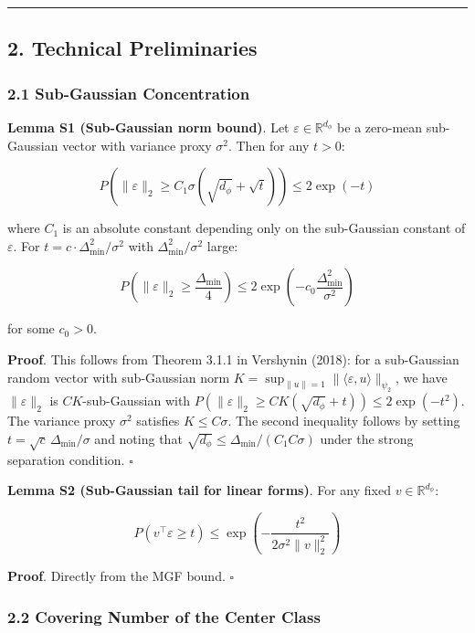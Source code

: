 \documentclass[
  12pt,
]{article}
\begin{document}
\begin{center}\rule{0.5\linewidth}{0.5pt}\end{center}

\subsection{2. Technical Preliminaries}\label{technical-preliminaries}

\subsubsection{2.1 Sub-Gaussian
Concentration}\label{sub-gaussian-concentration}

\textbf{Lemma S1 (Sub-Gaussian norm bound)}. Let
\(\varepsilon \in \mathbb{R}^{d_\phi}\) be a zero-mean sub-Gaussian
vector with variance proxy \(\sigma^2\). Then for any \(t > 0\):

\[P\left(\|\varepsilon\|_2 \geq C_1 \sigma \left(\sqrt{d_\phi} + \sqrt{t}\right)\right) \leq 2 \exp(-t)\]

where \(C_1\) is an absolute constant depending only on the sub-Gaussian
constant of \(\varepsilon\). For
\(t = c \cdot \Delta_{\min}^2 / \sigma^2\) with
\(\Delta_{\min}^2 / \sigma^2\) large:

\[P\left(\|\varepsilon\|_2 \geq \frac{\Delta_{\min}}{4}\right) \leq 2 \exp\left(-c_0 \frac{\Delta_{\min}^2}{\sigma^2}\right)\]

for some \(c_0 > 0\).

\textbf{Proof}. This follows from Theorem 3.1.1 in Vershynin (2018): for
a sub-Gaussian random vector with sub-Gaussian norm
\(K = \sup_{\|u\|=1} \|\langle \varepsilon, u\rangle\|_{\psi_2}\), we
have \(\|\varepsilon\|_2\) is \(C K\)-sub-Gaussian with
\(P(\|\varepsilon\|_2 \geq C K (\sqrt{d_\phi} + t)) \leq 2\exp(-t^2)\).
The variance proxy \(\sigma^2\) satisfies \(K \leq C\sigma\). The second
inequality follows by setting \(t = \sqrt{c}\,\Delta_{\min}/\sigma\) and
noting that \(\sqrt{d_\phi} \leq \Delta_{\min}/(C_1 C \sigma)\) under
the strong separation condition. \(\square\)

\textbf{Lemma S2 (Sub-Gaussian tail for linear forms)}. For any fixed
\(v \in \mathbb{R}^{d_\phi}\):

\[P\left(v^\top \varepsilon \geq t\right) \leq \exp\left(-\frac{t^2}{2\sigma^2 \|v\|_2^2}\right)\]

\textbf{Proof}. Directly from the MGF bound. \(\square\)

\subsubsection{2.2 Covering Number of the Center
Class}\label{covering-number-of-the-center-class}
\end{document}
